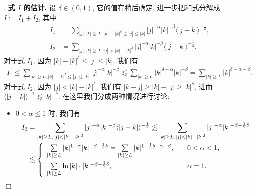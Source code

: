 \documentclass[master]{cugthesis}
\newenvironment{proof}{{\noindent\itshape 证明}.}{\hfill $\Box$\par}
\begin{document}
\begin{proof}
{\bf 式 $I$ 的估计.} 设 $\delta\in (0,1)$, 它的值在稍后确定. 进一步把和式分解成
$I:=I_1+I_2$,  其中
 \begin{align}
I_1 &= \sum_{|j|,|k|\ge L, |k|-|k|^\delta\leq |j|\leq |k|} |j|^{-\alpha}|k|^{-\beta}\langle |j-k|\rangle^{-\frac{1}{2}},\label{equ-426-14}\\
I_2 &= \sum_{|j|,|k|\ge L, |j|> |k|-|k|^\delta} |j|^{-\alpha}|k|^{-\beta}\langle |j-k|\rangle^{-\frac{1}{2}}.\label{equ-426-15}
 \end{align}
对于式 $I_1$,  因为 $|k|-|k|^\delta\le |j|\le |k|$, 我们有
\begin{align}\label{equ-426-16}
       I_1       \le  \sum_{|k|\ge L,|k|-|k|^\delta\le|j|\le |k|}|j|^{-\alpha}|k|^{-\beta}
       \lesssim  \sum_{|k|\ge L}|k|^{\delta-\alpha}|k|^{-\beta}=\sum_{|k|\ge L}|k|^{\delta-\alpha-\beta}.
\end{align}
对于式 $I_2$, 因为 $|j|<|k|-|k|^\delta$, 我们有 $|k-j|\ge |k|-|j|\ge |k|^\delta$, 进而  $\langle |j-k| \rangle^{-1}\lesssim|k|^{-\delta}$. 在这里我们分成两种情况进行讨论:
     \begin{itemize}
        \item  $0<\alpha\leq 1$ 时, 我们有
     \begin{align}
        I_2&= \sum_{|k|\ge L,|j|<|k|-|k|^\delta}|j|^{-\alpha}|k|^{-\beta}\langle |j-k|\rangle^{-\frac{1}{2}}\lesssim \sum_{|k|\ge L,|j|<|k|-|k|^{\delta}}|j|^{-\alpha}|k|^{-\beta-\frac{1}{2}\delta}\nonumber\\
        &\lesssim
     \left\{
     \begin{array}{ll}
     \sum_{|k|\ge L }\limits|k|^{1-\alpha}|k|^{-\beta-\frac{1}{2}\delta}=\sum_{|k|\ge L}\limits|k|^{1-\frac{1}{2}\delta-\alpha-\beta}, \quad & 0<\alpha<1, \vspace{1ex}\\
      \sum_{|k|\ge L }\limits\ln|k|\cdot|k|^{-\beta-\frac{1}{2}\delta}, \quad & \alpha=1.
     \end{array}
     \right. \label{equ-426-17}
     \end{align}


\end{itemize}
\end{proof}
\end{document}
